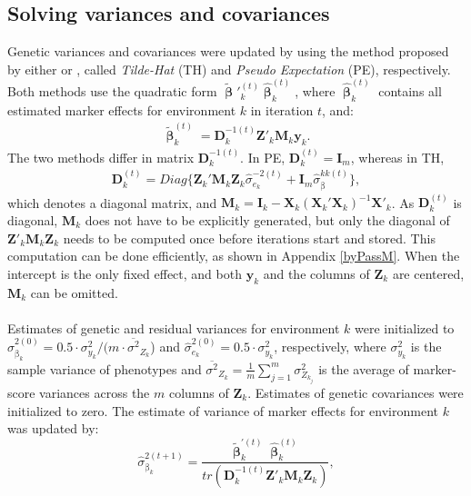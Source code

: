 \documentclass{bmcart}
\begin{document}
\subsection{Solving variances and covariances}
Genetic variances and covariances were updated by using the method proposed by either \cite{VanRaden} or \cite{Schaeffer}, called \textsl{Tilde-Hat} (TH) and \textsl{Pseudo Expectation} (PE), respectively. Both methods use the quadratic form $\tilde{\mathbf{\upbeta}}'^{(t)}_k\hat{\mathbf{\upbeta}}^{(t)}_k$, 
where $\hat{\mathbf{\upbeta}}^{(t)}_k$ contains all estimated marker effects for environment $k$ in iteration $t$, and:
\begin{align}\label{BetaTilde}
 \tilde{\mathbf{\upbeta}}^{(t)}_k = \mathbf{D}^{-1(t)}_k\mathbf{Z}'_k \mathbf{M}_{k} \mathbf{y}_k.
\end{align}
The two methods differ in matrix $\mathbf{D}^{-1(t)}_k$. In PE, $\mathbf{D}^{(t)}_k = \mathbf{I}_m$, whereas in TH,
\begin{align}\label{MatrixD}
\mathbf{D}^{(t)}_k = Diag\{\mathbf{Z}_k'\mathbf{M}_k \mathbf{Z}_k\hat{\sigma}^{-2(t)}_{e_k}+\mathbf{I}_m\hat{\sigma}^{kk(t)}_{\upbeta}\},
\end{align}
which denotes a diagonal matrix, and $\mathbf{M}_{k}=\mathbf{I}_k-\mathbf{X}_{k} ( \mathbf{X}_{k}'\mathbf{X}_{k})^{-1} \mathbf{X}'_{k}$. As $\mathbf{D}^{(t)}_k$ is diagonal, $\mathbf{M}_{k}$ does not have to be explicitly generated, but only the diagonal
of $\mathbf{Z}'_{k} \mathbf{M}_{k} \mathbf{Z}_{k}$ needs to be computed once before iterations start and stored. This computation can be done efficiently, as shown in Appendix \ref{byPassM}. When the intercept is the only fixed effect, and both $\mathbf{y}_k$ and the columns of $\mathbf{Z}_k$ are centered, $\mathbf{M}_k$ can be omitted.
\\\\
Estimates of genetic and residual variances for environment $k$ were initialized to $\hat{\sigma}^{2(0)}_{\upbeta_k} = 0.5\cdot\sigma^2_{y_k}/(m\cdot\overline{\sigma^2}_{Z_k}$)
and $\hat{\sigma}^{2(0)}_{e_k} = 0.5\cdot\sigma^2_{y_k}$, respectively, where $\sigma^2_{y_k}$ is the sample variance of phenotypes and $\overline{\sigma^2}_{Z_k} = \frac{1}{m}\sum^m_{j=1}\sigma^2_{Z_{k_j}}$ is the average of marker-score variances across the $m$ columns of $\mathbf{Z}_k$. Estimates of genetic covariances were initialized to zero. The estimate of variance of marker effects for environment $k$ was updated by:
\begin{equation}
\label{eqn:SigmaBk}
\hat{\sigma}^{2(t+1)}_{\upbeta_k} = \frac{\tilde{\mathbf{\upbeta}}^{'(t)}_k\hat{\mathbf{\upbeta}}^{(t)}_k}{tr(\mathbf{D}^{-1(t)}_k \mathbf{Z}'_k \mathbf{M}_{k} \mathbf{Z}_k)},
\end{equation}
\end{document}
